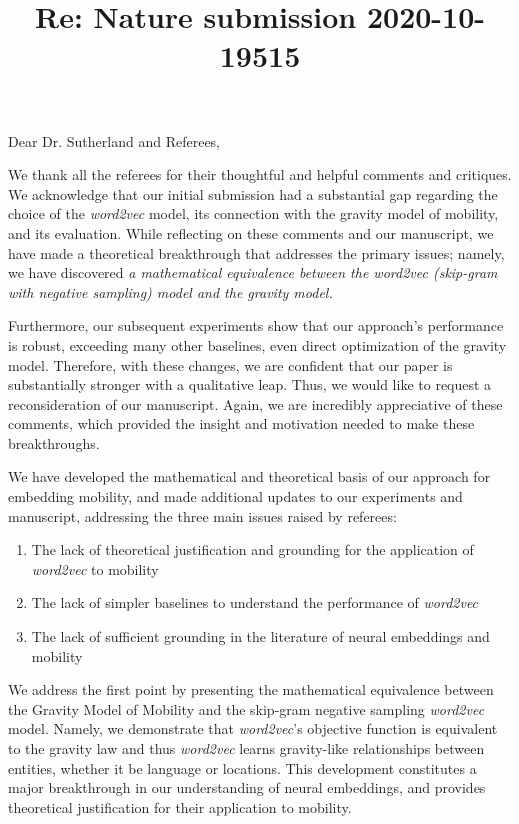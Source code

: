 \documentclass[12pt,a4paper]{article}
\title{Re: Nature submission 2020-10-19515}
\date{}
\makeatletter
\newcounter{comment}[subsection]
\renewcommand{\maketitle}{\bgroup\setlength{\parindent}{0pt}
\begin{flushleft}
\Large  \textbf{\@title}
\end{flushleft}\egroup
}
\makeatother
\begin{document}
\maketitle

\bigskip
\thispagestyle{empty}
\vspace{-0.4cm}
\noindent Dear Dr. Sutherland and Referees,\\
\vspace{-0.25cm}

We thank all the referees for their thoughtful and helpful comments and critiques.
We acknowledge that our initial submission had a substantial gap regarding the choice of the \textit{word2vec} model, its connection with the gravity model of mobility, and its evaluation.
While reflecting on these comments and our manuscript, we have made a theoretical breakthrough that addresses the primary issues;
namely, we have discovered \emph{a mathematical equivalence between the \textit{word2vec} (skip-gram with negative sampling) model and the gravity model.}

Furthermore, our subsequent experiments show that our approach's performance is robust, exceeding many other baselines, even direct optimization of the gravity model.
Therefore, with these changes, we are confident that our paper is substantially stronger with a qualitative leap.
Thus, we would like to request a reconsideration of our manuscript.
Again, we are incredibly appreciative of these comments, which provided the insight and motivation needed to make these breakthroughs.

We have developed the mathematical and theoretical basis of our approach for embedding mobility, and made additional updates to our experiments and manuscript, addressing the three main issues raised by referees:
\vspace{-0.1cm}
\begin{enumerate}
	\itemsep0em
	\item The lack of theoretical justification and grounding for the application of \textit{word2vec} to mobility
	\item The lack of simpler baselines to understand the performance of \textit{word2vec}
	\item The lack of sufficient grounding in the literature of neural embeddings and mobility
\end{enumerate}
\vspace{-0.1cm}
We address the first point by presenting the mathematical equivalence between the Gravity Model of Mobility and the skip-gram negative sampling \textit{word2vec} model.
Namely, we demonstrate that \textit{word2vec}'s objective function is equivalent to the gravity law and thus \textit{word2vec} learns gravity-like relationships between entities, whether it be language or locations.
This development constitutes a major breakthrough in our understanding of neural embeddings, and provides theoretical justification for their application to mobility.
\end{document}

